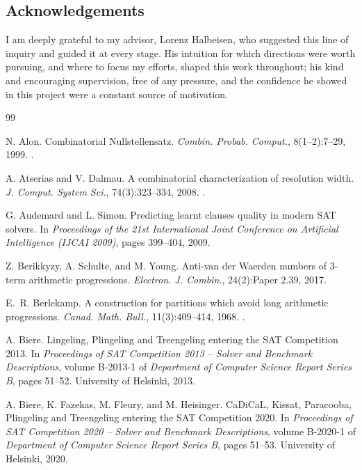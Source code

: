 \documentclass[12pt]{article}
\begin{document}
\subsection*{Acknowledgements}
I am deeply grateful to my advisor, Lorenz Halbeisen, who suggested
this line of inquiry and guided it at every stage. His intuition for
which directions were worth pursuing, and where to focus my efforts,
shaped this work throughout; his kind and encouraging supervision,
free of any pressure, and the confidence he showed in this project
were a constant source of motivation.

\begin{thebibliography}{99}

N. Alon. Combinatorial Nullstellensatz. \emph{Combin. Probab. Comput.},
8(1--2):7--29, 1999. .

A. Atserias and V. Dalmau. A combinatorial characterization of
resolution width. \emph{J. Comput. System Sci.}, 74(3):323--334, 2008.
.

G. Audemard and L. Simon. Predicting learnt clauses quality in modern
{SAT} solvers. In \emph{Proceedings of the 21st International Joint
Conference on Artificial Intelligence (IJCAI 2009)}, pages 399--404,
2009.

Z. Berikkyzy, A. Schulte, and M. Young. Anti-van der Waerden numbers of
$3$-term arithmetic progressions. \emph{Electron. J. Combin.},
24(2):Paper 2.39, 2017.

E.~R. Berlekamp. A construction for partitions which avoid long
arithmetic progressions. \emph{Canad. Math. Bull.}, 11(3):409--414,
1968. .

A. Biere. Lingeling, {Plingeling} and {Treengeling} entering the
{SAT} {Competition} 2013. In \emph{Proceedings of SAT Competition
2013 -- Solver and Benchmark Descriptions}, volume B-2013-1 of
\emph{Department of Computer Science Report Series B}, pages 51--52.
University of Helsinki, 2013.

A. Biere, K. Fazekas, M. Fleury, and M. Heisinger. {CaDiCaL},
{Kissat}, {Paracooba}, {Plingeling} and {Treengeling} entering the
{SAT} {Competition} 2020. In \emph{Proceedings of SAT Competition
2020 -- Solver and Benchmark Descriptions}, volume B-2020-1 of
\emph{Department of Computer Science Report Series B}, pages 51--53.
University of Helsinki, 2020.


\end{thebibliography}
\end{document}
